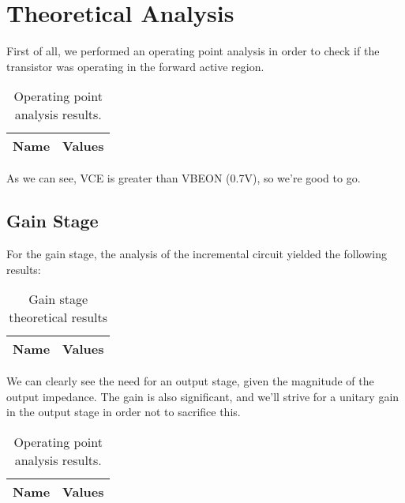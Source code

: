 \section{Theoretical Analysis}
\label{sec:analysis}
First of all, we performed an operating point analysis in order to check if the transistor was operating in the forward active region.
\begin{table}[h!]
  \centering
  \begin{tabular}{|l|r|}
    \hline    
    {\bf Name} & {\bf Values} \\ \hline
     
  \end{tabular}
  \caption{Operating point analysis results.}
  \label{tab:data}
\end{table}

As we can see, VCE is greater than VBEON (0.7V), so we're good to go.
\subsection{Gain Stage}
For the gain stage, the analysis of the incremental circuit yielded the following results:
\begin{table}[h]
  \centering
  \begin{tabular}{|l|r|}
    \hline    
    {\bf Name} & {\bf Values} \\ \hline
     
  \end{tabular}
  \caption{Gain stage theoretical results}
  \label{tab:gain}
\end{table}

We can clearly see the need for an output stage, given the magnitude of the output impedance. The gain is also significant, and we'll strive for a unitary gain in the output stage in order not to sacrifice this.
\begin{table}[h!]
  \centering
  \begin{tabular}{|l|r|}
    \hline    
    {\bf Name} & {\bf Values} \\ \hline
     
  \end{tabular}
  \caption{Operating point analysis results.}
  \label{tab:data2}
\end{table}

